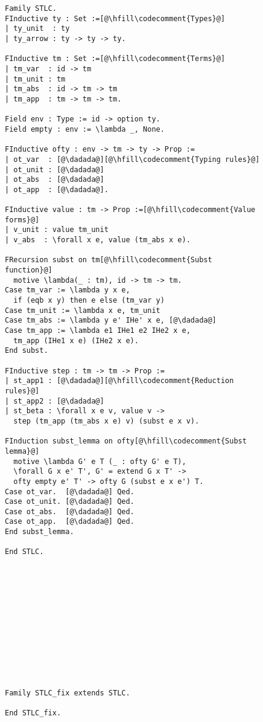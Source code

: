\begin{figure}
\begin{minipage}{\textwidth}
\begin{multicols}{2}

\begin{lstlisting}
Family STLC.
FInductive ty : Set :=[@\hfill\codecomment{Types}@]
| ty_unit  : ty
| ty_arrow : ty -> ty -> ty.

FInductive tm : Set :=[@\hfill\codecomment{Terms}@]
| tm_var  : id -> tm
| tm_unit : tm
| tm_abs  : id -> tm -> tm
| tm_app  : tm -> tm -> tm.

Field env : Type := id -> option ty.
Field empty : env := \lambda _, None.

FInductive ofty : env -> tm -> ty -> Prop :=
| ot_var  : [@\dadada@][@\hfill\codecomment{Typing rules}@]
| ot_unit : [@\dadada@]
| ot_abs  : [@\dadada@]
| ot_app  : [@\dadada@].

FInductive value : tm -> Prop :=[@\hfill\codecomment{Value forms}@]
| v_unit : value tm_unit
| v_abs  : \forall x e, value (tm_abs x e).

FRecursion subst on tm[@\hfill\codecomment{Subst function}@] 
  motive \lambda(_ : tm), id -> tm -> tm.
Case tm_var := \lambda y x e,
  if (eqb x y) then e else (tm_var y)
Case tm_unit := \lambda x e, tm_unit
Case tm_abs := \lambda y e' IHe' x e, [@\dadada@]
Case tm_app := \lambda e1 IHe1 e2 IHe2 x e,
  tm_app (IHe1 x e) (IHe2 x e).
End subst.

FInductive step : tm -> tm -> Prop :=
| st_app1 : [@\dadada@][@\hfill\codecomment{Reduction rules}@]
| st_app2 : [@\dadada@]
| st_beta : \forall x e v, value v ->
  step (tm_app (tm_abs x e) v) (subst e x v).

FInduction subst_lemma on ofty[@\hfill\codecomment{Subst lemma}@]
  motive \lambda G' e T (_ : ofty G' e T),
  \forall G x e' T', G' = extend G x T' ->
  ofty empty e' T' -> ofty G (subst e x e') T.
Case ot_var.  [@\dadada@] Qed.
Case ot_unit. [@\dadada@] Qed.
Case ot_abs.  [@\dadada@] Qed.
Case ot_app.  [@\dadada@] Qed.
End subst_lemma.

End STLC.













Family STLC_fix extends STLC.

End STLC_fix.

\end{lstlisting}


\end{multicols}
\end{minipage}
\end{figure}
